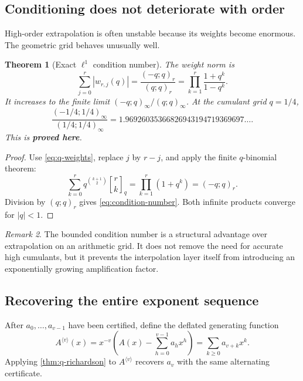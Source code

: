 \documentclass[11pt,oneside]{article}
\numberwithin{equation}{section}
\newtheorem{theorem}{Theorem}[section]
\theoremstyle{definition}
\theoremstyle{remark}
\newtheorem{remark}[theorem]{Remark}
\newcommand{\qbinom}[3]{\genfrac{[}{]}{0pt}{}{#1}{#2}_{#3}}
\newcommand{\statusproved}{\textcolor{deepgreen}{\textbf{proved here}}}
\begin{document}
\subsection{Conditioning does not deteriorate with order}

High-order extrapolation is often unstable because its weights become enormous.  The
geometric grid behaves unusually well.

\begin{theorem}[Exact $\ell^1$ condition number]
\label{thm:condition-number}
The weight norm is
\begin{equation}
 \boxed{
 \sum_{j=0}^{r}|w_{r,j}(q)|
 =\frac{(-q;q)_r}{(q;q)_r}
 =\prod_{k=1}^{r}\frac{1+q^k}{1-q^k}.}
 \label{eq:condition-number}
\end{equation}
It increases to the finite limit $(-q;q)_\infty/(q;q)_\infty$.  At the cumulant grid
$q=1/4$,
\begin{equation}
 \frac{(-1/4;1/4)_\infty}{(1/4;1/4)_\infty}
 =1.96926035366826943194719369697\ldots.
 \label{eq:qquarter-condition}
\end{equation}
This is \statusproved.
\end{theorem}

\begin{proof}
Use \eqref{eq:q-weights}, replace $j$ by $r-j$, and apply the finite $q$-binomial theorem:
\[
 \sum_{k=0}^{r}q^{\binom{k+1}{2}}\qbinom{r}{k}{q}
 =\prod_{k=1}^{r}(1+q^k)=(-q;q)_r.
\]
Division by $(q;q)_r$ gives \eqref{eq:condition-number}.  Both infinite products converge
for $|q|<1$.
\end{proof}

\begin{remark}
The bounded condition number is a structural advantage over extrapolation on an arithmetic
grid.  It does not remove the need for accurate high cumulants, but it prevents the
interpolation layer itself from introducing an exponentially growing amplification factor.
\end{remark}

\subsection{Recovering the entire exponent sequence}

After $a_0,\ldots,a_{v-1}$ have been certified, define the deflated generating function
\begin{equation}
 A^{\langle v\rangle}(x)
 =x^{-v}\left(A(x)-\sum_{h=0}^{v-1}a_hx^h\right)
 =\sum_{k\ge0}a_{v+k}x^k.
 \label{eq:deflated-A}
\end{equation}
Applying \cref{thm:q-richardson} to $A^{\langle v\rangle}$ recovers $a_v$ with the same
alternating certificate.
\end{document}
